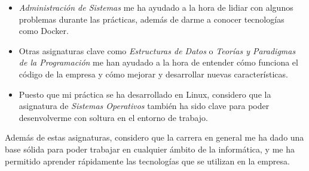 \begin{itemize}
	\item \emph{Administración de Sistemas} me ha ayudado a la hora de lidiar con algunos
		problemas durante las prácticas, además de darme a conocer tecnologías como Docker.
	\item Otras asignaturas clave como \emph{Estructuras de Datos} o \emph{Teorías y Paradigmas
		de la Programación} me han ayudado a la hora de entender cómo funciona el código de
		la empresa y cómo mejorar y desarrollar nuevas características.
	\item Puesto que mi práctica se ha desarrollado en Linux, considero que la asignatura
		de \emph{Sistemas Operativos} también ha sido clave para poder desenvolverme con
		soltura en el entorno de trabajo.
\end{itemize}

Además de estas asignaturas, considero que la carrera en general me ha dado una base sólida
para poder trabajar en cualquier ámbito de la informática, y me ha permitido aprender
rápidamente las tecnologías que se utilizan en la empresa.
